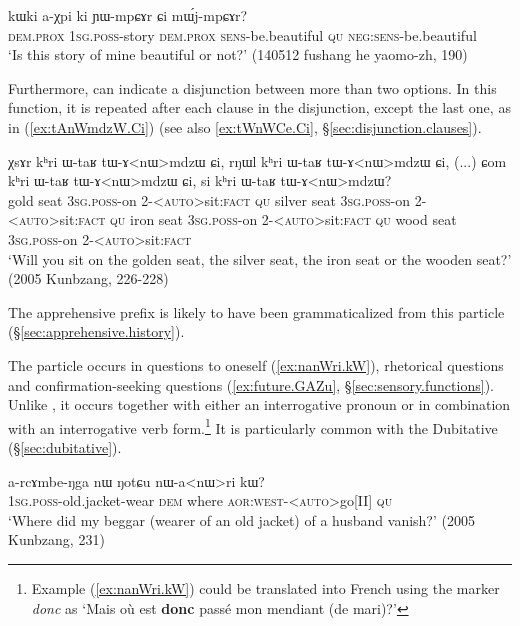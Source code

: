 \begin{exe}
\ex \label{ex:YWmpCAr.Ci}
\gll kɯki a-χpi ki ɲɯ-mpɕɤr ɕi mɯ́j-mpɕɤr? \\
\textsc{dem}.\textsc{prox} \textsc{1sg}.\textsc{poss}-story \textsc{dem}.\textsc{prox} \textsc{sens}-be.beautiful \textsc{qu} \textsc{neg}:\textsc{sens}-be.beautiful \\
\glt `Is this story of mine beautiful or not?' (140512 fushang he yaomo-zh, 190)
\end{exe}

Furthermore,  can indicate a disjunction between more than two options. In this function, it is repeated after each clause in the disjunction, except the last one, as in (\ref{ex:tAnWmdzW.Ci}) (see also \ref{ex:tWnWCe.Ci}, §\ref{sec:disjunction.clauses}).

\begin{exe}
\ex \label{ex:tAnWmdzW.Ci}
\gll  χsɤr kʰri ɯ-taʁ tɯ-ɤ<nɯ>mdzɯ ɕi, rŋɯl kʰri ɯ-taʁ tɯ-ɤ<nɯ>mdzɯ ɕi, (...) ɕom kʰri ɯ-taʁ tɯ-ɤ<nɯ>mdzɯ ɕi, si kʰri ɯ-taʁ tɯ-ɤ<nɯ>mdzɯ? \\
gold seat \textsc{3sg}.\textsc{poss}-on 2-<\textsc{auto}>sit:\textsc{fact}  \textsc{qu} silver seat \textsc{3sg}.\textsc{poss}-on 2-<\textsc{auto}>sit:\textsc{fact}  \textsc{qu}  {  } iron seat \textsc{3sg}.\textsc{poss}-on 2-<\textsc{auto}>sit:\textsc{fact}  \textsc{qu} wood seat \textsc{3sg}.\textsc{poss}-on 2-<\textsc{auto}>sit:\textsc{fact}  \\
\glt `Will you sit on the golden seat, the silver seat, the iron seat or the wooden seat?' (2005 Kunbzang, 226-228)
\end{exe}

The apprehensive prefix  is likely to have been grammaticalized from this particle (§\ref{sec:apprehensive.history}).

The particle  occurs in questions to oneself (\ref{ex:nanWri.kW}), rhetorical questions and confirmation-seeking questions  (\ref{ex:future.GAZu}, §\ref{sec:sensory.functions}). Unlike , it occurs together with either an interrogative pronoun or in combination with an interrogative verb form.\footnote{Example  (\ref{ex:nanWri.kW}) could be translated into French using the marker \textit{donc} as `Mais où est \textbf{donc} passé mon mendiant (de mari)?' } It is particularly common with the Dubitative (§\ref{sec:dubitative}).

\begin{exe}
\ex \label{ex:nanWri.kW}
\gll a-rcɤmbe-ŋga nɯ ŋotɕu nɯ-a<nɯ>ri kɯ? \\
\textsc{1sg}.\textsc{poss}-old.jacket-wear \textsc{dem} where \textsc{aor}:\textsc{west}-<\textsc{auto}>go[II] \textsc{qu} \\
\glt `Where did my beggar (wearer of an old jacket) of a husband vanish?' (2005 Kunbzang, 231)
\end{exe}

